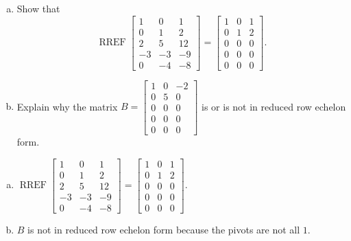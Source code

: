 
\begin{exerciseStatement}

\begin{enumerate}[(a)]
\item Show that \[\operatorname{RREF} \left[\begin{array}{ccc}
1 & 0 & 1 \\
0 & 1 & 2 \\
2 & 5 & 12 \\
-3 & -3 & -9 \\
0 & -4 & -8
\end{array}\right] = \left[\begin{array}{ccc}
1 & 0 & 1 \\
0 & 1 & 2 \\
0 & 0 & 0 \\
0 & 0 & 0 \\
0 & 0 & 0
\end{array}\right] .\]
\item Explain why the matrix \(B= \left[\begin{array}{ccc}
1 & 0 & -2 \\
0 & 5 & 0 \\
0 & 0 & 0 \\
0 & 0 & 0 \\
0 & 0 & 0
\end{array}\right] \) is or is not in reduced row echelon form.
\end{enumerate}
    
\end{exerciseStatement}
    
\begin{exerciseAnswer} 

\begin{enumerate}[(a)]
\item \(\operatorname{RREF} \left[\begin{array}{ccc}
1 & 0 & 1 \\
0 & 1 & 2 \\
2 & 5 & 12 \\
-3 & -3 & -9 \\
0 & -4 & -8
\end{array}\right] = \left[\begin{array}{ccc}
1 & 0 & 1 \\
0 & 1 & 2 \\
0 & 0 & 0 \\
0 & 0 & 0 \\
0 & 0 & 0
\end{array}\right] .\)
\item \(B\) is not in reduced row echelon form because the pivots are not all \(1\). 
\end{enumerate}
    
\end{exerciseAnswer}
    
